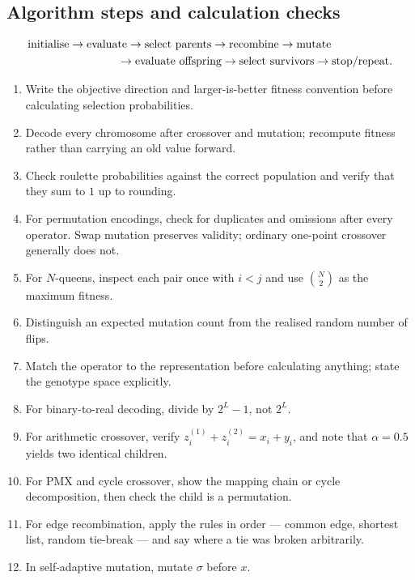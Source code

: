 \documentclass[11pt,a4paper]{article}
\begin{document}
\subsection{Algorithm steps and calculation checks}
\begin{align*}
  &\text{initialise}\to\text{evaluate}\to\text{select parents}
  \to\text{recombine}\to\text{mutate}\\
  &\hspace{28mm}\to\text{evaluate offspring}
  \to\text{select survivors}\to\text{stop/repeat}.
\end{align*}
\begin{enumerate}[leftmargin=*,nosep]
  \item Write the objective direction and larger-is-better fitness convention
        before calculating selection probabilities.
  \item Decode every chromosome after crossover and mutation; recompute
        fitness rather than carrying an old value forward.
  \item Check roulette probabilities against the correct population and
        verify that they sum to $1$ up to rounding.
  \item For permutation encodings, check for duplicates and omissions after
        every operator. Swap mutation preserves validity; ordinary one-point
        crossover generally does not.
  \item For $N$-queens, inspect each pair once with $i<j$ and use
        $\binom N2$ as the maximum fitness.
  \item Distinguish an expected mutation count from the realised random
        number of flips.
  \item Match the operator to the representation before calculating anything;
        state the genotype space explicitly.
  \item For binary-to-real decoding, divide by $2^L-1$, not $2^L$.
  \item For arithmetic crossover, verify $z^{(1)}_i+z^{(2)}_i=x_i+y_i$, and
        note that $\alpha=0.5$ yields two identical children.
  \item For PMX and cycle crossover, show the mapping chain or cycle
        decomposition, then check the child is a permutation.
  \item For edge recombination, apply the rules in order --- common edge,
        shortest list, random tie-break --- and say where a tie was broken
        arbitrarily.
  \item In self-adaptive mutation, mutate $\sigma$ before $x$.
\end{enumerate}
\end{document}
